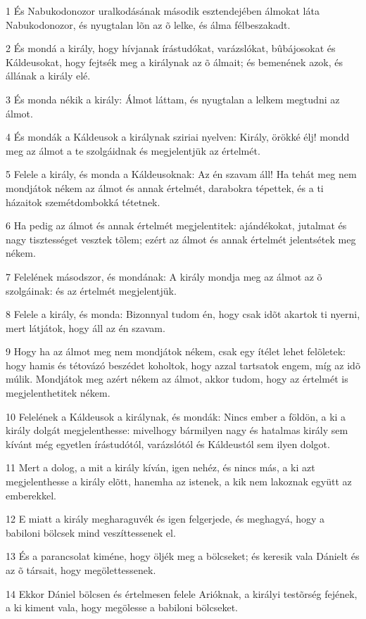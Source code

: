 \par 1 És Nabukodonozor uralkodásának második esztendejében álmokat láta Nabukodonozor, és nyugtalan lõn az õ lelke, és álma félbeszakadt.
\par 2 És mondá a király, hogy hívjanak írástudókat, varázslókat, bûbájosokat és Káldeusokat, hogy fejtsék meg a királynak az õ álmait; és bemenének azok, és állának a király elé.
\par 3 És monda nékik a király: Álmot láttam, és nyugtalan a lelkem megtudni az álmot.
\par 4 És mondák a Káldeusok a királynak sziriai nyelven: Király, örökké élj! mondd meg az álmot a te szolgáidnak és megjelentjük az értelmét.
\par 5 Felele a király, és monda a Káldeusoknak: Az én szavam áll! Ha tehát meg nem mondjátok nékem az álmot és annak értelmét, darabokra tépettek, és a ti házaitok szemétdombokká tétetnek.
\par 6 Ha pedig az álmot és annak értelmét megjelentitek: ajándékokat, jutalmat és nagy tisztességet vesztek tõlem; ezért az álmot és annak értelmét jelentsétek meg nékem.
\par 7 Felelének másodszor, és mondának: A király mondja meg az álmot az õ szolgáinak: és az értelmét megjelentjük.
\par 8 Felele a király, és monda: Bizonnyal tudom én, hogy csak idõt akartok ti nyerni, mert látjátok, hogy áll az én szavam.
\par 9 Hogy ha az álmot meg nem mondjátok nékem, csak egy ítélet lehet felõletek: hogy hamis és tétovázó beszédet koholtok, hogy azzal tartsatok engem, míg az idõ múlik. Mondjátok meg azért nékem az álmot, akkor tudom, hogy az értelmét is megjelenthetitek nékem.
\par 10 Felelének a Káldeusok a királynak, és mondák: Nincs ember a földön, a ki a király dolgát megjelenthesse: mivelhogy bármilyen nagy és hatalmas király sem kívánt még egyetlen írástudótól, varázslótól és Káldeustól sem ilyen dolgot.
\par 11 Mert a dolog, a mit a király kíván, igen nehéz, és nincs más, a ki azt megjelenthesse a király elõtt, hanemha az istenek, a kik nem lakoznak együtt az emberekkel.
\par 12 E miatt a király megharaguvék és igen felgerjede, és meghagyá, hogy a babiloni bölcsek mind veszíttessenek el.
\par 13 És a parancsolat kiméne, hogy öljék meg a bölcseket; és keresik vala Dánielt és az õ társait, hogy megölettessenek.
\par 14 Ekkor Dániel bölcsen és értelmesen felele Arióknak, a királyi testõrség fejének, a ki kiment vala, hogy megölesse a babiloni bölcseket.
